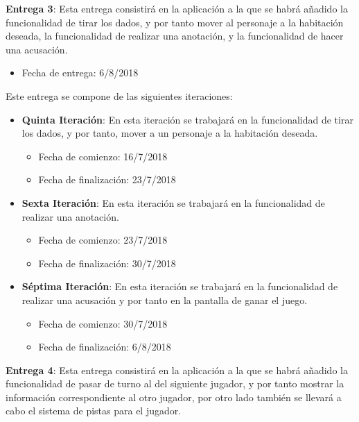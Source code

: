 \hfill

\textbf{Entrega 3}: Esta entrega consistirá en la aplicación a la que se habrá añadido la funcionalidad de tirar los dados, y por tanto mover al personaje a la habitación deseada, la funcionalidad de realizar una anotación, y la funcionalidad de hacer una acusación.

\begin{itemize}
  \item Fecha de entrega: 6/8/2018
\end{itemize}

\hfill

Este entrega se compone de las siguientes iteraciones:

\begin{itemize}
  \item \textbf{Quinta Iteración}: En esta iteración se trabajará en la funcionalidad de tirar los dados, y por tanto, mover a un personaje a la habitación deseada.

  \begin{itemize}
    \item Fecha de comienzo: 16/7/2018
    \item Fecha de finalización: 23/7/2018
  \end{itemize}

  \item \textbf{Sexta Iteración}: En esta iteración se trabajará en la funcionalidad de realizar una anotación.

  \begin{itemize}
    \item Fecha de comienzo: 23/7/2018
    \item Fecha de finalización: 30/7/2018
  \end{itemize}

  \item \textbf{Séptima Iteración}: En esta iteración se trabajará en la funcionalidad de realizar una acusación y por tanto en la pantalla de ganar el juego.

  \begin{itemize}
    \item Fecha de comienzo: 30/7/2018
    \item Fecha de finalización: 6/8/2018
  \end{itemize}
\end{itemize}

\hfill

\textbf{Entrega 4}: Esta entrega consistirá en la aplicación a la que se habrá añadido la funcionalidad de pasar de turno al del siguiente jugador, y por tanto mostrar la información correspondiente al otro jugador, por otro lado también se llevará a cabo el sistema de pistas para el jugador.

